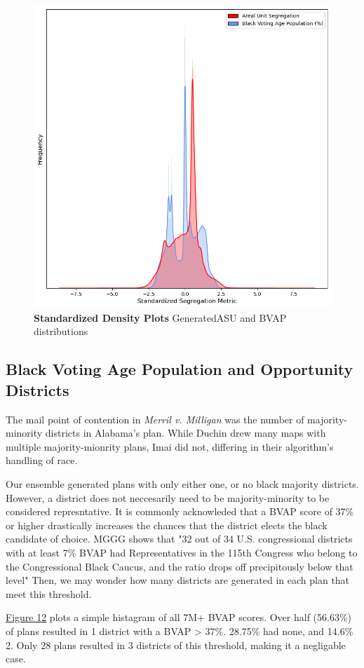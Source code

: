 \documentclass{article}
\begin{document}
\begin{figure}[h]\label{fig 11}
    \centering
    \includegraphics[scale=.35]{images/compare_kde.png}
    \caption{\textbf{Standardized Density Plots} GeneratedASU and BVAP distributions}
\end{figure}

\pagebreak

\subsection*{Black Voting Age Population and Opportunity Districts}

The mail point of contention in \emph{Merril v. Milligan} was the number of majority-minority districts in Alabama's plan. While Duchin drew many maps with multiple majority-mionrity plans, Imai did not, differing in their algorithm's handling of race. 
\par
Our ensemble generated plans with only either one, or no black majority districts. However, a district does not neccesarily need to be majority-minority to be considered represntative. It is commonly acknowleded that a BVAP score of 37\% or higher drastically increases the chances that the district elects the black candidate of choice. MGGG shows that "32 out of 34  U.S. congressional districts with at least 7\% BVAP had Representatives in the 115th Congress who belong to the Congressional Black Caucus, and the ratio drops off precipitously below that level" \cite{VAREPORT.} Then, we may wonder how many districts are generated in each plan that meet this threshold. 
\par
\hyperref[fig 12]{Figure 12} plots a simple histagram of all 7M+ BVAP scores. Over half (56.63\%) of plans resulted in 1 district with a BVAP > 37\%. 28.75\% had none, and 14.6\% 2. Only 28 plans resulted in 3 districts of this threshold, making it a negligable case. 
\end{document}
